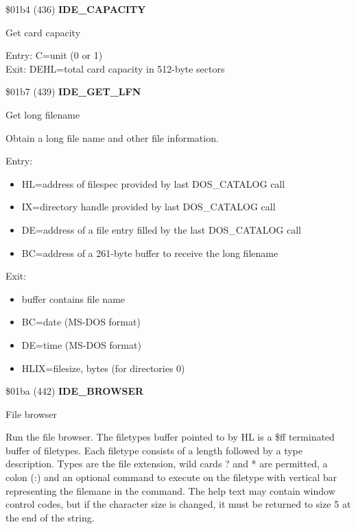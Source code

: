 \$01b4 (436) \textbf{IDE\_CAPACITY}

Get card capacity

Entry: C=unit (0 or 1)\\
Exit: DEHL=total card capacity in 512-byte sectors

\$01b7 (439) \textbf{IDE\_GET\_LFN}

Get long filename

Obtain a long file name and other file information.

Entry:
\begin{itemize}
\item[] HL=address of filespec provided by last DOS\_CATALOG call
\item[] IX=directory handle provided by last DOS\_CATALOG call
\item[] DE=address of a file entry filled by the last DOS\_CATALOG call
\item[] BC=address of a 261-byte buffer to receive the long filename
\end{itemize}
Exit:
\begin{itemize}
\item[] buffer contains file name
\item[] BC=date (MS-DOS format)
\item[] DE=time (MS-DOS format)
\item[] HLIX=filesize, bytes (for directories 0)
\end{itemize}

\$01ba (442) \textbf{IDE\_BROWSER}

File browser

Run the file browser. The filetypes buffer pointed to by HL is a \$ff
terminated buffer of filetypes. Each filetype consists of a length
followed by a type description. Types are the file extension, wild
cards ? and * are permitted, a colon (:) and an optional command to
execute on the filetype with vertical bar representing the filemane in
the command. The help text may contain window control codes, but if
the character size is changed, it must be returned to size 5 at the
end of the string.

